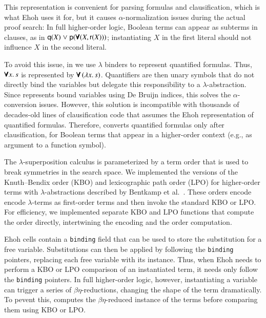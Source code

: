 This representation is convenient for parsing formulas and clausification, which
is what Ehoh uses it for, but it
causes $\alpha$-normalization issues during the actual proof search: In
full higher-order logic, Boolean terms can appear as subterms in clauses, as in
$\mathsf{q}(X) \mathrel\lor \mathsf{p}(\pmb{\forall}(X, \mathsf{r}(X)))$;
instantiating $X$ in the first literal should not influence $X$ in the second
literal.

To avoid this issue, in \ehohii{} we use $\lambda$ binders to represent quantified formulas.
Thus, $\pmb{\forall} x. \, s$ is represented by $\pmb{\forall} \, (\lambda x. \, s)$.
Quantifiers are then unary symbols that do not directly bind
the variables but delegate this responsibility to a $\lambda$-abstraction.
%
Since \ehohii{} represents bound variables using De Bruijn indices, this solves the
$\alpha$-conversion issues. However, this solution is incompatible with
thousands of decades-old lines of clausification code that assumes the Ehoh
representation of
quantified formulas. Therefore, \ehohii{} converts quantified
formulas only after clausification, for Boolean terms that appear in a
higher-order context (e.g., as argument to a function symbol).

The $\lambda$-superposition calculus is parameterized by a term order that is
used to break symmetries in the search space.
We implemented the versions of the Knuth--Bendix order (KBO) and lexicographic
path order (LPO) for higher-order terms with $\lambda$-abstractions described by
Bentkamp et al.~\cite{bbtv-21-full-ho-sup}. These orders encode
encode $\lambda$-terms as first-order terms and then invoke the standard KBO or
LPO. %
For efficiency, we implemented separate KBO and
LPO functions that compute the order directly, intertwining the encoding and
the order computation.

Ehoh cells contain a \verb|binding| field that can be used to store the
substitution for a free variable. Substitutions can then be applied by following
the \texttt{binding} pointers, replacing each free variable with its instance.
Thus, when Ehoh needs to perform a KBO or LPO comparison of an instantiated term,
it needs only follow the \texttt{binding} pointers.
In full higher-order logic, however, instantiating a variable can trigger a
series of $\beta\eta$-reductions,
changing the shape of the term dramatically. To pevent this, \ehohii{}
computes the $\beta\eta$-reduced instance of the terms
before comparing them using KBO or LPO.

